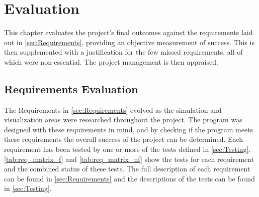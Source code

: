 
\chapter{Evaluation}\label{sec:Evaluation}

This chapter evaluates the project's final outcomes against the requirements laid out in \cref{sec:Requirements}, providing an objective measurement of success.
This is then supplemented with a justification for the few missed requirements, all of which were non-essential.
The project management is then appraised.

\section{Requirements Evaluation}\label{sec:Evaluation:FailedReq}
The Requirements in \cref{sec:Requirements} evolved as the simulation and visualization areas were researched throughout the project.
The program was designed with these requirements in mind, and by checking if the program meets these requirements the overall success of the project can be determined.
Each requirement has been tested by one or more of the tests defined in \cref{sec:Testing}.
\cref{tab:req_matrix_f} and \cref{tab:req_matrix_nf} show the tests for each requirement and the combined status of these tests.
The full description of each requirement can be found in \cref{sec:Requirements} and the descriptions of the tests can be found in \cref{sec:Testing}.







